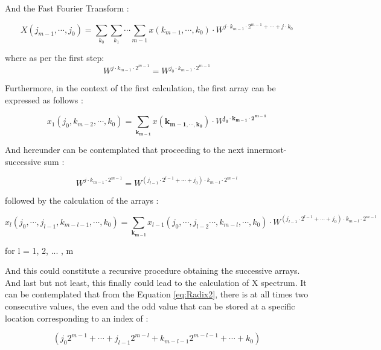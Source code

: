 {{And the Fast Fourier Transform \cite{CooleyTukey1965}:

\begin{equation}
	X(j_{m-1}, \cdots ,j_0) = \sum_{k_{0}} \sum_{k_{1}} \cdots \sum_{m-1} x({k_{m-1} , \cdots , k_0}) \cdot W^{j \cdot k_{m-1} \cdot 2^{m-1} + \cdots + j \cdot k_0}
	\label{eq:FFT}
\end{equation}

where as per the first step:
\begin{equation}
	W^{j \cdot k_{m-1} \cdot 2^{m-1}} = W^{j_{0} \cdot k_{m-1} \cdot 2^{m-1}}
\end{equation}

Furthermore, in the context of the first calculation, the first array can be expressed as follows \cite{CooleyTukey1965}:

\begin{equation}
	x_{1}(j_0, k_{m-2}, \cdots, k_0) = \sum_{\mathbf{k_{m-1}}} x(\mathbf{k_{m-1, \cdots, k_0}}) \cdot W^{\mathbf{j_0}  \cdot \mathbf{k_{m-1}} \cdot \mathbf{2^{m-1}} }
\end{equation}

And hereunder can be contemplated that proceeding to the next innermost-successive sum \cite{CooleyTukey1965}:

\begin{equation}
	W^{j \cdot k_{m-1} \cdot 2^{m-1}} = W^{(j_{l-1} \cdot 2^{l-1} + \cdots + j_0) \cdot k_{m-l} \cdot 2^{m-l}}
\end{equation}

followed by the calculation of the arrays \cite{CooleyTukey1965}:

\begin{equation}
	x_{l}(j_0, \cdots, j_{l-1} , k_{m-l-1} , \cdots, k_0) = \sum_{\mathbf{k_{m-l}}} x_{l-1}(j_0, \cdots , j_{l-2} \cdots, k_{m-l} , \cdots , k_0) \cdot  W^{(j_{l-1} \cdot 2^{l-1} + \cdots + j_0) \cdot k_{m-l} \cdot 2^{m-l}}
	\label{eq:Radix2}
\end{equation}

for l = 1, 2, ... , m

And this could constitute a recursive procedure obtaining the successive arrays. And last but not least, this finally could lead to the calculation of X spectrum. It can be contemplated that from the Equation \eqref{eq:Radix2}, there is at all times two consecutive values, the even and the odd value that can be stored at a specific location corresponding to an index of \cite{CooleyTukey1965}: 

\begin{equation}
	(j_0 2^{m-1} + \cdots + j_{l-1} 2^{m-l} +  k_{m-l-1} 2^{m-l-1} + \cdots + k_0)
\end{equation}

}}
